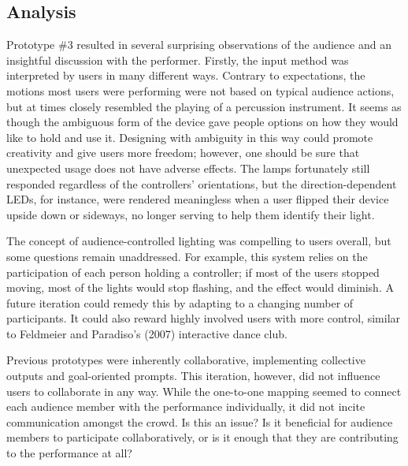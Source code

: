 \subsection{Analysis}


Prototype \#3 resulted in several surprising observations of the audience and an insightful discussion with the performer. Firstly, the input method was interpreted by users in many different ways. Contrary to expectations, the motions most users were performing were not based on typical audience actions, but at times closely resembled the playing of a percussion instrument. It seems as though the ambiguous form of the device gave people options on how they would like to hold and use it. Designing with ambiguity in this way could promote creativity and give users more freedom; however, one should be sure that unexpected usage does not have adverse effects. The lamps fortunately still responded regardless of the controllers' orientations, but the direction-dependent LEDs, for instance, were rendered meaningless when a user flipped their device upside down or sideways, no longer serving to help them identify their light.

The concept of audience-controlled lighting was compelling to users overall, but some questions remain unaddressed. For example, this system relies on the participation of each person holding a controller; if most of the users stopped moving, most of the lights would stop flashing, and the effect would diminish. A future iteration could remedy this by adapting to a changing number of participants. It could also reward highly involved users with more control, similar to Feldmeier and Paradiso's (2007) interactive dance club.

Previous prototypes were inherently collaborative, implementing collective outputs and goal-oriented prompts. This iteration, however, did not influence users to collaborate in any way. While the one-to-one mapping seemed to connect each audience member with the performance individually, it did not incite communication amongst the crowd. Is this an issue? Is it beneficial for audience members to participate collaboratively, or is it enough that they are contributing to the performance at all?


